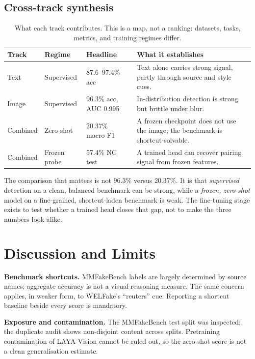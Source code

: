 \documentclass[11pt]{article}
\begin{document}
\subsection{Cross-track synthesis}

\begin{table}[t]
\centering
\small
\caption{What each track contributes. This is a map, not a ranking: datasets, tasks, metrics, and training regimes differ.}
\label{tab:synth}
\begin{tabularx}{\textwidth}{@{}l l l X@{}}
\toprule
\textbf{Track} & \textbf{Regime} & \textbf{Headline} & \textbf{What it establishes} \\
\midrule
Text & Supervised & 87.6--97.4\% acc & Text alone carries strong signal, partly through source and style cues. \\
Image & Supervised & 96.3\% acc, AUC 0.995 & In-distribution detection is strong but brittle under blur. \\
Combined & Zero-shot & 20.37\% macro-F1 & A frozen checkpoint does not use the image; the benchmark is shortcut-solvable. \\
Combined & Frozen probe & 57.4\% NC test & A trained head can recover pairing signal from frozen features. \\
\bottomrule
\end{tabularx}
\end{table}

The comparison that matters is not 96.3\% versus 20.37\%. It is that \emph{supervised} detection on a clean, balanced benchmark can be strong, while a \emph{frozen, zero-shot} model on a fine-grained, shortcut-laden benchmark is weak. The fine-tuning stage exists to test whether a trained head closes that gap, not to make the three numbers look alike.

\section{Discussion and Limits}

\textbf{Benchmark shortcuts.} MMFakeBench labels are largely determined by source names; aggregate accuracy is not a visual-reasoning measure. The same concern applies, in weaker form, to WELFake's ``reuters'' cue. Reporting a shortcut baseline beside every score is mandatory.

\textbf{Exposure and contamination.} The MMFakeBench test split was inspected; the duplicate audit shows non-disjoint content across splits. Pretraining contamination of LAYA-Vision cannot be ruled out, so the zero-shot score is not a clean generalisation estimate.
\end{document}
